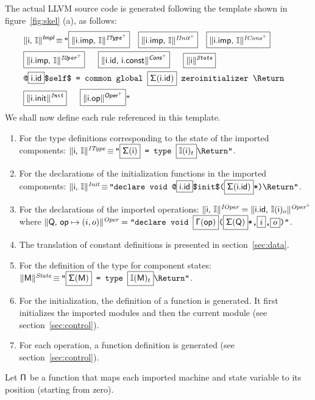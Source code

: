 \documentclass{llncs}
\newcommand{\trad}[2]{\ensuremath{\lVert \textsf{#1} \rVert^{\textit{#2}}}}
\newcommand{\nl}[0]{\text{\Return}}
\DeclareMathOperator{\isdef}{\equiv}
\newcommand{\llvm}[1]{\texttt{#1}}
\newcommand{\B}[1]{\textsf{#1}}
\newcommand{\ListOf}[1]{$\mbox{#1}^+$}
\newcommand{\PH}[1]{\framebox{$#1$}}
\newcommand{\intf}[0]{\ensuremath{\mathbb{I}}}
\newcommand{\Global}[0]{\ensuremath{\sf\Gamma}}
\newcommand{\idx}[0]{\ensuremath{\sf\Pi}}
\newcommand{\state}[0]{\ensuremath{\sf\Sigma}}
\begin{document}
The actual LLVM source code is generated following the template shown in
figure~\ref{fig:skel} (a), as follows:
\begin{align*}
  \lefteqn{\trad{\B{i}, \intf}{\B{Impl}} \isdef
  \llvm{"\PH{\trad{\B{i.imp}, \intf}{\ListOf{IType}}}} 
  \quad \PH{\trad{\B{i.imp}, \intf}{\ListOf{IInit}}}
  \quad \PH{\trad{\B{i.imp}, \intf}{\ListOf{ICons}}}} \\
& \llvm{\PH{\trad{\B{i.imp}, \intf}{\ListOf{IOper}}}
  \quad \PH{\trad{\B{i.id}, \B{i.const}}{\ListOf{\B{Cons}}}}
  \quad \PH{\trad{\B{i}}{State}}} \\
& \llvm{@\PH{\B{i.id}}\$self\$ = common global \PH{\state(\B{i.id})} zeroinitializer \nl} \\
& \llvm{\PH{\trad{\B{i.init}}{Init}} 
  \quad \PH{\trad{\B{i.op}}{\ListOf{\B{Oper}}}}"}
\end{align*}
We shall now define each rule referenced in this template.
\begin{enumerate}
\item For the type definitions corresponding to the state of the imported
  components: $\trad{i, \intf}{IType} \isdef \llvm{"\PH{\state(\B{i})} =
    type \PH{\intf(\B{i})_t}\nl"}$.
\item For the declarations of the initialization functions in the imported
  components: $\trad{\B{i}, \intf}{Init} \isdef \llvm{"declare void
    @\PH{\B{i.id}}\$init\$(\PH{\state(\B{i.id})}*)\nl"}$.
\item For the declarations of the imported operations: $\trad{\B{i},
    \intf}{IOper} = \trad{\B{i.id}, $\intf(\B{i})_o$}{\ListOf{Oper}}$ where
  $\trad{\B{Q}, $\B{op} \mapsto (i, o)$}{Oper} = \llvm{"declare void
    \PH{\Global(\B{op})}(\PH{\state(\B{Q})}*,\PH{i},\PH{o})"}$.
\item The translation of constant definitions is presented in section~\ref{sec:data}.
\item For the definition of the type for component states: \\
\noindent$\trad{\B{M}}{State} \isdef
\llvm{"\PH{\state(\B{M})} = type \PH{\intf(\B{M})_t}\nl"}$.
\item For the initialization, the definition of a function is generated. It
  first initializes the imported modules and then the current module (see
  section~\ref{sec:control}).
\item For each operation, a function definition is generated (see
  section~\ref{sec:control}).
\end{enumerate}
Let $\idx$ be a function that maps each imported machine and state variable to
its position (starting from zero).
\end{document}
